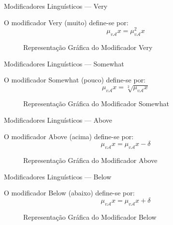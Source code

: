 \documentclass[portuges]{beamer}
\begin{document}
\begin{frame}{Modificadores Linguísticos --- Very}
	\begin{definition}[Very]
		O modificador \alert{Very} (muito) define-se por:
		$$\mu_{v\mathcal{A}}{x} = \mu_{v\mathcal{A}}^2{x}$$ 
	\end{definition}
	\begin{figure}
			\centering
			\caption{Representação Gráfica do Modificador Very}
	\end{figure}	
\end{frame}

\begin{frame}{Modificadores Linguísticos --- Somewhat}
	\begin{definition}[Somewhat]
		O modificador \alert{Somewhat} (pouco) define-se por:
		$$\mu_{v\mathcal{A}}{x} = \sqrt[2]{\mu_{v\mathcal{A}}{x}}$$ 
	\end{definition}
	\begin{figure}
			\centering
			\caption{Representação Gráfica do Modificador Somewhat}
	\end{figure}	
\end{frame}

\begin{frame}{Modificadores Linguísticos --- Above}
	\begin{definition}[Above]
		O modificador \alert{Above} (acima) define-se por:
		$$\mu_{v\mathcal{A}}{x} =\mu_{v\mathcal{A}}{x} - \delta$$ 
	\end{definition}
	\begin{figure}
			\centering
			\caption{Representação Gráfica do Modificador Above}
	\end{figure}	
\end{frame}

\begin{frame}{Modificadores Linguísticos --- Below}
	\begin{definition}[Below]
		O modificador \alert{Below} (abaixo) define-se por:
		$$\mu_{v\mathcal{A}}{x} = \mu_{v\mathcal{A}}{x} + \delta$$ 
	\end{definition}
	\begin{figure}
			\centering
			\caption{Representação Gráfica do Modificador Below}
	\end{figure}	
\end{frame}
\end{document}
